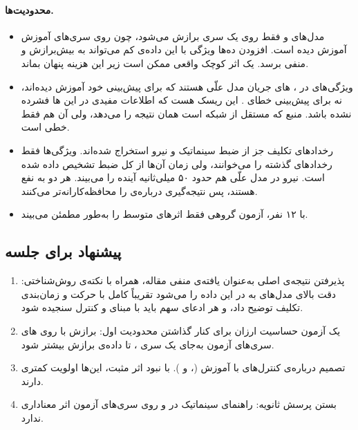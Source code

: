 \paragraph{محدودیت‌ها.}
\begin{itemize}
\item {} مدل‌های  و  فقط روی یک سری  برازش می‌شود، چون  روی سری‌های آموزش آموزش دیده است. افزودن ده‌ها ویژگی  با این داده‌ی کم می‌تواند به بیش‌برازش و  منفی برسد. یک اثر کوچک واقعی ممکن است زیر این هزینه پنهان بماند.
\item ویژگی‌های  در ، های جریان  مدل علّی  هستند که برای پیش‌بینی خود  آموزش دیده‌اند، نه برای پیش‌بینی خطای . این ریسک هست که اطلاعات مفیدی در این ها فشرده نشده باشد. منبع  که مستقل از شبکه است همان نتیجه را می‌دهد، ولی آن هم فقط خطی است.
\item رخدادهای تکلیف جز  از ضبط سینماتیک و نیرو استخراج شده‌اند. ویژگی‌ها فقط رخدادهای گذشته را می‌خوانند، ولی زمان آن‌ها از کل ضبط تشخیص داده شده است.  نیرو در مدل علّی هم حدود ۵۰ میلی‌ثانیه آینده را می‌بیند. هر دو به نفع  هستند، پس نتیجه‌گیری درباره‌ی  را محافظه‌کارانه‌تر می‌کنند.
\item با ۱۲ نفر، آزمون گروهی فقط اثرهای متوسط را به‌طور مطمئن می‌بیند.
\end{itemize}

\subsection{پیشنهاد برای جلسه}

\begin{enumerate}
\item پذیرفتن نتیجه‌ی اصلی به‌عنوان یافته‌ی منفی مقاله، همراه با نکته‌ی روش‌شناختی: دقت بالای مدل‌های  به  در این داده را می‌شود تقریباً کامل با حرکت و زمان‌بندی تکلیف توضیح داد، و هر ادعای سهم  باید با مبنای  و کنترل  سنجیده شود.
\item یک آزمون حساسیت ارزان برای کنار گذاشتن محدودیت اول: برازش  با  روی های سری‌های آزمون به‌جای یک سری ، تا داده‌ی برازش بیشتر شود.
\item تصمیم درباره‌ی کنترل‌های  با آموزش (،  و ). با نبود اثر مثبت، این‌ها اولویت کمتری دارند.
\item بستن پرسش ثانویه: راهنمای سینماتیک در  و روی سری‌های آزمون اثر معناداری ندارد.
\end{enumerate}
